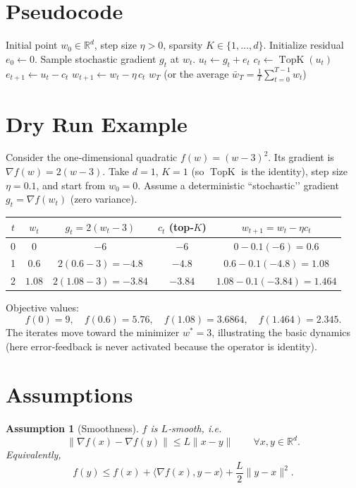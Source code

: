 \documentclass{article}
\newtheorem{assumption}{Assumption}
\newcommand{\R}{\mathbb{R}}
\newcommand{\topK}{\operatorname{TopK}}
\begin{document}
\section*{Pseudocode}
\begin{algorithm}[H]
\caption{Top‑K Error‑Feedback SGD (EF‑SGD)}\label{alg:efsgd}
\begin{algorithmic}[1]
\Require Initial point $w_0\in\R^{d}$, step size $\eta>0$, sparsity $K\in\{1,\dots,d\}$.
\State Initialize residual $e_0\gets 0$.
    \State Sample stochastic gradient $g_t$ at $w_t$.
    \State $u_t \gets g_t + e_t$ \hfill{}
    \State $c_t \gets \topK(u_t)$ \hfill{}
    \State $e_{t+1} \gets u_t - c_t$ \hfill{}
    \State $w_{t+1} \gets w_t - \eta\,c_t$ \hfill{}
\EndFor
\State \Return $w_T$ (or the average $\bar w_T=\tfrac1T\sum_{t=0}^{T-1} w_t$)
\end{algorithmic}
\end{algorithm}

\section*{Dry Run Example}
Consider the one‑dimensional quadratic $f(w)=(w-3)^{2}$.  Its gradient is $\nabla f(w)=2(w-3)$.  
Take $d=1$, $K=1$ (so $\topK$ is the identity), step size $\eta=0.1$, and start from $w_0=0$.
Assume a deterministic ``stochastic’’ gradient $g_t=\nabla f(w_t)$ (zero variance).

\begin{center}
\begin{tabular}{c|c|c|c|c}
$t$ & $w_t$ & $g_t=2(w_t-3)$ & $c_t$ (top‑$K$) & $w_{t+1}=w_t-\eta c_t$ \\ \hline
0 & $0$ & $-6$ & $-6$ & $0-0.1(-6)=0.6$ \\
1 & $0.6$ & $2(0.6-3)=-4.8$ & $-4.8$ & $0.6-0.1(-4.8)=1.08$ \\
2 & $1.08$ & $2(1.08-3)=-3.84$ & $-3.84$ & $1.08-0.1(-3.84)=1.464$ 
\end{tabular}
\end{center}
Objective values:
\[
f(0)=9,\quad f(0.6)=5.76,\quad f(1.08)=3.6864,\quad f(1.464)=2.345.
\]
The iterates move toward the minimizer $w^{*}=3$, illustrating the basic dynamics (here error‑feedback is never activated because the operator is identity).

\section*{Assumptions}
\begin{assumption}[Smoothness]\label{ass:smooth}
$f$ is $L$‑smooth, i.e.
\[
\|\nabla f(x)-\nabla f(y)\|\le L\|x-y\|\qquad\forall x,y\in\R^{d}.
\]
Equivalently,
\[
f(y)\le f(x)+\langle\nabla f(x),y-x\rangle+\frac{L}{2}\|y-x\|^{2}.
\]
\end{assumption}
\end{document}
